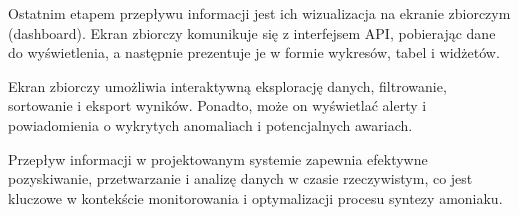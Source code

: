 Ostatnim etapem przepływu informacji jest ich wizualizacja na ekranie zbiorczym (dashboard). Ekran zbiorczy komunikuje się z interfejsem API, pobierając dane do wyświetlenia, a następnie prezentuje je w formie wykresów, tabel i widżetów.

Ekran zbiorczy umożliwia interaktywną eksplorację danych, filtrowanie, sortowanie i eksport wyników. Ponadto, może on wyświetlać alerty i powiadomienia o wykrytych anomaliach i potencjalnych awariach.

Przepływ informacji w projektowanym systemie zapewnia efektywne pozyskiwanie, przetwarzanie i analizę danych w czasie rzeczywistym, co jest kluczowe w kontekście monitorowania i optymalizacji procesu syntezy amoniaku. 